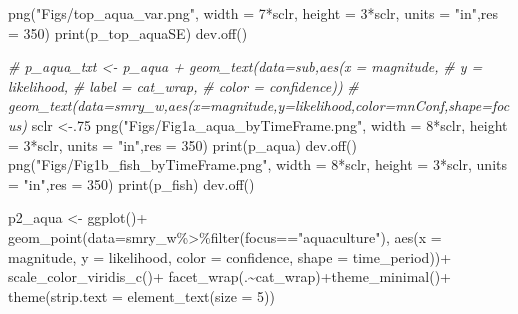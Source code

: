 \documentclass[
]{article}
\newenvironment{Shaded}{\begin{snugshade}}{\end{snugshade}}
\newcommand{\AttributeTok}[1]{\textcolor[rgb]{0.77,0.63,0.00}{#1}}
\newcommand{\CommentTok}[1]{\textcolor[rgb]{0.56,0.35,0.01}{\textit{#1}}}
\newcommand{\DecValTok}[1]{\textcolor[rgb]{0.00,0.00,0.81}{#1}}
\newcommand{\FunctionTok}[1]{\textcolor[rgb]{0.00,0.00,0.00}{#1}}
\newcommand{\NormalTok}[1]{#1}
\newcommand{\OtherTok}[1]{\textcolor[rgb]{0.56,0.35,0.01}{#1}}
\newcommand{\SpecialCharTok}[1]{\textcolor[rgb]{0.00,0.00,0.00}{#1}}
\newcommand{\StringTok}[1]{\textcolor[rgb]{0.31,0.60,0.02}{#1}}
\begin{document}
\begin{Shaded}
\begin{Highlighting}[]
    \FunctionTok{png}\NormalTok{(}\StringTok{"Figs/top\_aqua\_var.png"}\NormalTok{, }\AttributeTok{width =} \DecValTok{7}\SpecialCharTok{*}\NormalTok{sclr, }\AttributeTok{height =} \DecValTok{3}\SpecialCharTok{*}\NormalTok{sclr, }\AttributeTok{units =} \StringTok{"in"}\NormalTok{,}\AttributeTok{res =} \DecValTok{350}\NormalTok{)}
    \FunctionTok{print}\NormalTok{(p\_top\_aquaSE)}
    \FunctionTok{dev.off}\NormalTok{()}
      
      
      
    \CommentTok{\# p\_aqua\_txt \textless{}{-} p\_aqua + geom\_text(data=sub,aes(x = magnitude,}
    \CommentTok{\#                                          y     = likelihood,}
    \CommentTok{\#                                          label = cat\_wrap,}
    \CommentTok{\#                                          color = confidence))}
    \CommentTok{\# geom\_text(data=smry\_w,aes(x=magnitude,y=likelihood,color=mnConf,shape=focus)}
\NormalTok{    sclr }\OtherTok{\textless{}{-}}\NormalTok{.}\DecValTok{75}
    \FunctionTok{png}\NormalTok{(}\StringTok{"Figs/Fig1a\_aqua\_byTimeFrame.png"}\NormalTok{, }
        \AttributeTok{width =} \DecValTok{8}\SpecialCharTok{*}\NormalTok{sclr, }\AttributeTok{height =} \DecValTok{3}\SpecialCharTok{*}\NormalTok{sclr, }\AttributeTok{units =} \StringTok{"in"}\NormalTok{,}\AttributeTok{res =} \DecValTok{350}\NormalTok{)}
    \FunctionTok{print}\NormalTok{(p\_aqua)}
    \FunctionTok{dev.off}\NormalTok{()}
    \FunctionTok{png}\NormalTok{(}\StringTok{"Figs/Fig1b\_fish\_byTimeFrame.png"}\NormalTok{, }
        \AttributeTok{width =} \DecValTok{8}\SpecialCharTok{*}\NormalTok{sclr, }\AttributeTok{height =} \DecValTok{3}\SpecialCharTok{*}\NormalTok{sclr, }\AttributeTok{units =} \StringTok{"in"}\NormalTok{,}\AttributeTok{res =} \DecValTok{350}\NormalTok{)}
    \FunctionTok{print}\NormalTok{(p\_fish)}
    \FunctionTok{dev.off}\NormalTok{()}
    
\NormalTok{    p2\_aqua }\OtherTok{\textless{}{-}} \FunctionTok{ggplot}\NormalTok{()}\SpecialCharTok{+}
      \FunctionTok{geom\_point}\NormalTok{(}\AttributeTok{data=}\NormalTok{smry\_w}\SpecialCharTok{\%\textgreater{}\%}\FunctionTok{filter}\NormalTok{(focus}\SpecialCharTok{==}\StringTok{"aquaculture"}\NormalTok{),}
                            \FunctionTok{aes}\NormalTok{(}\AttributeTok{x     =}\NormalTok{ magnitude,}
                                \AttributeTok{y     =}\NormalTok{ likelihood,}
                                \AttributeTok{color =}\NormalTok{ confidence,}
                                \AttributeTok{shape =}\NormalTok{ time\_period))}\SpecialCharTok{+}
      \FunctionTok{scale\_color\_viridis\_c}\NormalTok{()}\SpecialCharTok{+}
      \FunctionTok{facet\_wrap}\NormalTok{(.}\SpecialCharTok{\textasciitilde{}}\NormalTok{cat\_wrap)}\SpecialCharTok{+}\FunctionTok{theme\_minimal}\NormalTok{()}\SpecialCharTok{+} 
      \FunctionTok{theme}\NormalTok{(}\AttributeTok{strip.text =} \FunctionTok{element\_text}\NormalTok{(}\AttributeTok{size =} \DecValTok{5}\NormalTok{))}
       

\end{Highlighting}
\end{Shaded}
\end{document}
